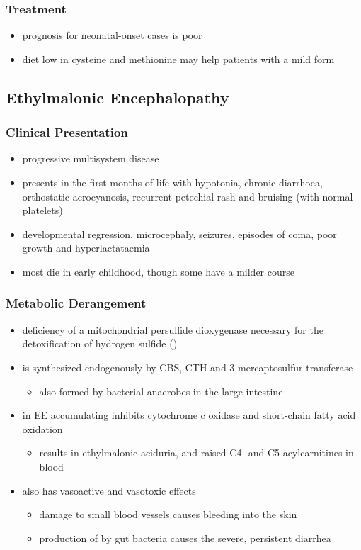\documentclass{scrartcl}
\begin{document}
\subsubsection{Treatment}
\label{sec:org36e3eee}
\begin{itemize}
\item prognosis for neonatal-onset cases is poor
\item diet low in cysteine and methionine may help patients with a mild
form
\end{itemize}

\subsection{Ethylmalonic Encephalopathy}
\label{sec:orgc3cf8d1}
\subsubsection{Clinical Presentation}
\label{sec:orgc03c655}
\begin{itemize}
\item progressive multisystem disease
\item presents in the first months of life with hypotonia, chronic
diarrhoea, orthostatic acrocyanosis, recurrent petechial rash and
bruising (with normal platelets)
\item developmental regression, microcephaly, seizures, episodes of coma,
poor growth and hyperlactataemia
\item most die in early childhood, though some have a milder course
\end{itemize}

\subsubsection{Metabolic Derangement}
\label{sec:orgd5c58c7}
\begin{itemize}
\item deficiency of a mitochondrial persulfide dioxygenase necessary for the
detoxification of hydrogen sulfide ()
\item {} is synthesized endogenously by CBS, CTH and
3-mercaptosulfur transferase
\begin{itemize}
\item also formed by bacterial anaerobes in the large intestine
\end{itemize}
\item in EE accumulating  inhibits cytochrome c oxidase and
short-chain fatty acid oxidation
\begin{itemize}
\item results in ethylmalonic aciduria, and raised C4- and
C5-acylcarnitines in blood
\end{itemize}
\item {} also has vasoactive and vasotoxic effects
\begin{itemize}
\item damage to small blood vessels causes bleeding into the
skin
\item production of  by gut bacteria causes the severe, persistent diarrhea
\end{itemize}
\end{itemize}
\end{document}
